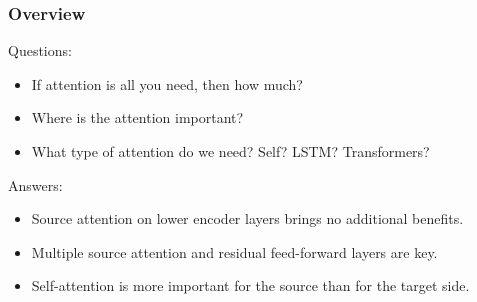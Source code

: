 \begin{frame}
\frametitle{Overview}

Questions:
\begin{itemize}
    \item If attention is all you need, then how much?
    \item Where is the attention important?
    \item What type of attention do we need? Self? LSTM? Transformers?
\end{itemize}

\pause
Answers:
\begin{itemize}
    \item Source attention on lower encoder layers brings no additional
    benefits.
    \item Multiple source attention and residual feed-forward layers are key.
    \item Self-attention is more important for the source than for the target
    side.
\end{itemize}

\end{frame}
